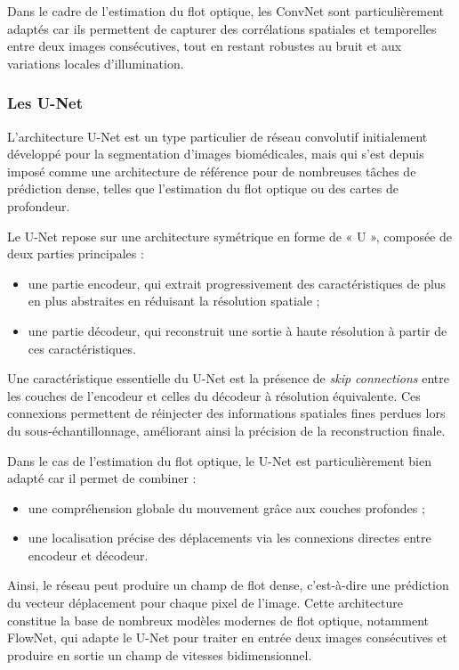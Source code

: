 \documentclass{magnolia}
\begin{document}
Dans le cadre de l'estimation du flot optique, les ConvNet sont particulièrement adaptés car ils permettent de capturer des corrélations spatiales et temporelles entre deux images consécutives, tout en restant robustes au bruit et aux variations locales d'illumination.


\subsubsection{Les U-Net}
L'architecture U-Net \cite{unet} est un type particulier de réseau convolutif initialement développé pour la segmentation d'images biomédicales, mais qui s'est depuis imposé comme une architecture de référence pour de nombreuses tâches de prédiction dense, telles que l'estimation du flot optique ou des cartes de profondeur.

Le U-Net repose sur une architecture symétrique en forme de « U », composée de deux parties principales :
\begin{itemize}
    \item une partie encodeur, qui extrait progressivement des caractéristiques de plus en plus abstraites en réduisant la résolution spatiale ;
    \item une partie décodeur, qui reconstruit une sortie à haute résolution à partir de ces caractéristiques.
\end{itemize}

Une caractéristique essentielle du U-Net est la présence de \emph{skip connections} entre les couches de l'encodeur et celles du décodeur à résolution équivalente. Ces connexions permettent de réinjecter des informations spatiales fines perdues lors du sous-échantillonnage, améliorant ainsi la précision de la reconstruction finale.

Dans le cas de l'estimation du flot optique, le U-Net est particulièrement bien adapté car il permet de combiner :
\begin{itemize}
    \item une compréhension globale du mouvement grâce aux couches profondes ;
    \item une localisation précise des déplacements via les connexions directes entre encodeur et décodeur.
\end{itemize}

Ainsi, le réseau peut produire un champ de flot dense, c'est-à-dire une prédiction du vecteur déplacement pour chaque pixel de l'image. Cette architecture constitue la base de nombreux modèles modernes de flot optique, notamment FlowNet, qui adapte le U-Net pour traiter en entrée deux images consécutives et produire en sortie un champ de vitesses bidimensionnel.
\end{document}
